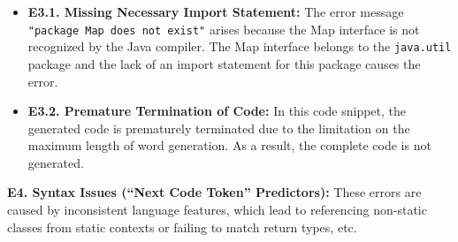 \begin{itemize}[left=10pt]
    \item \textbf{E3.1. Missing Necessary Import Statement:}  
    The error message \texttt{"package Map does not exist"} arises because the Map interface is not recognized by the Java compiler. The Map interface belongs to the \texttt{java.util} package and the lack of an import statement for this package causes the error.
    
    \item \textbf{E3.2. Premature Termination of Code:}  
    In this code snippet, the generated code is prematurely terminated due to the limitation on the maximum length of word generation. As a result, the complete code is not generated.
\end{itemize}

\textbf{E4. Syntax Issues (“Next Code Token” Predictors):}
These errors are caused by inconsistent language features, which lead to referencing non-static classes from static contexts or failing to match return types, etc.

